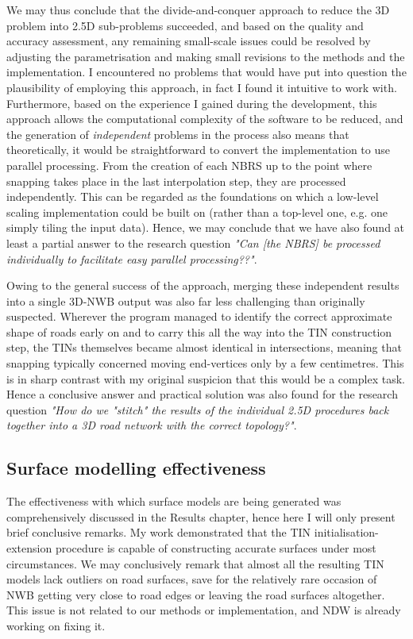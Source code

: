 We may thus conclude that the divide-and-conquer approach to reduce the 3D problem into 2.5D sub-problems succeeded, and based on the quality and accuracy assessment, any remaining small-scale issues could be resolved by adjusting the parametrisation and making small revisions to the methods and the implementation. I encountered no problems that would have put into question the plausibility of employing this approach, in fact I found it intuitive to work with. Furthermore, based on the experience I gained during the development, this approach allows the computational complexity of the software to be reduced, and the generation of \textit{independent} problems in the process also means that theoretically, it would be straightforward to convert the implementation to use parallel processing. From the creation of each NBRS up to the point where snapping takes place in the last interpolation step, they are processed independently. This can be regarded as the foundations on which a low-level scaling implementation could be built on (rather than a top-level one, e.g. one simply tiling the input data). Hence, we may conclude that we have also found at least a partial answer to the research question \textit{"Can [the NBRS] be processed individually to facilitate easy parallel processing??"}.

Owing to the general success of the approach, merging these independent results into a single 3D-NWB output was also far less challenging than originally suspected. Wherever the program managed to identify the correct approximate shape of roads early on and to carry this all the way into the TIN construction step, the TINs themselves became almost identical in intersections, meaning that snapping typically concerned moving end-vertices only by a few centimetres. This is in sharp contrast with my original suspicion that this would be a complex task. Hence a conclusive answer and practical solution was also found for the research question \textit{"How do we "stitch" the results of the individual 2.5D procedures back together into a 3D road network with the correct topology?"}.

\subsection{Surface modelling effectiveness}
\label{sub:effectivenessmodelling}

The effectiveness with which surface models are being generated was comprehensively discussed in the Results chapter, hence here I will only present brief conclusive remarks. My work demonstrated that the TIN initialisation-extension procedure is capable of constructing accurate surfaces under most circumstances. We may conclusively remark that almost all the resulting TIN models lack outliers on road surfaces, save for the relatively rare occasion of NWB getting very close to road edges or leaving the road surfaces altogether. This issue is not related to our methods or implementation, and NDW is already working on fixing it.

